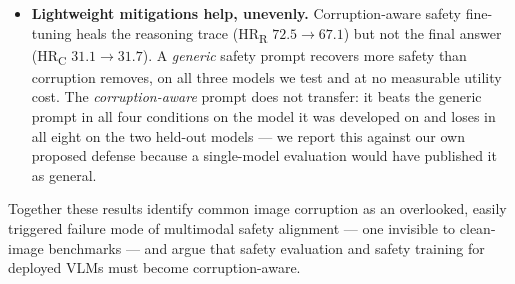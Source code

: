 \begin{itemize}
  \item \textbf{Lightweight mitigations help, unevenly.} Corruption-aware safety fine-tuning heals the reasoning trace (HR\textsubscript{R} $72.5\rightarrow67.1$) but not the final answer (HR\textsubscript{C} $31.1\rightarrow31.7$). A \emph{generic} safety prompt recovers more safety than corruption removes, on all three models we test and at no measurable utility cost. The \emph{corruption-aware} prompt does not transfer: it beats the generic prompt in all four conditions on the model it was developed on and loses in all eight on the two held-out models --- we report this against our own proposed defense because a single-model evaluation would have published it as general.
\end{itemize}

Together these results identify common image corruption as an overlooked, easily triggered failure mode of multimodal safety alignment --- one invisible to clean-image benchmarks --- and argue that safety evaluation and safety training for deployed VLMs must become corruption-aware.
